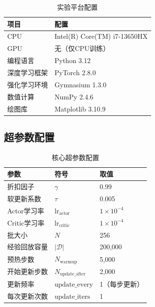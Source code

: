 \documentclass[UTF8,a4paper,12pt]{ctexart}
\begin{document}
\begin{table}[H]
\centering
\caption{实验平台配置}
\label{tab:env_setup}
\begin{tabular}{ll}
\toprule
\textbf{项目} & \textbf{配置} \\
\midrule
CPU & Intel(R) Core(TM) i7-13650HX \\
GPU & 无（仅CPU训练） \\
编程语言 & Python 3.12 \\
深度学习框架 & PyTorch 2.8.0 \\
强化学习环境 & Gymnasium 1.3.0 \\
数值计算 & NumPy 2.4.6 \\
绘图库 & Matplotlib 3.10.9 \\
\bottomrule
\end{tabular}
\end{table}

\subsection{超参数配置}

\begin{table}[H]
\centering
\caption{核心超参数配置}
\label{tab:hyperparams}
\begin{tabular}{lll}
\toprule
\textbf{参数} & \textbf{符号} & \textbf{取值} \\
\midrule
折扣因子 & $\gamma$ & 0.99 \\
软更新系数 & $\tau$ & 0.005 \\
Actor学习率 & $\text{lr}_{\text{actor}}$ & $1\times 10^{-4}$ \\
Critic学习率 & $\text{lr}_{\text{critic}}$ & $1\times 10^{-4}$ \\
批大小 & $N$ & 256 \\
经验回放容量 & $|\mathcal{D}|$ & 200,000 \\
预热步数 & $N_{\text{warmup}}$ & 5,000 \\
开始更新步数 & $N_{\text{update\_after}}$ & 2,000 \\
更新频率 & $\text{update\_every}$ & 1（每步更新） \\
每次更新次数 & $\text{update\_iters}$ & 1 \\
\bottomrule
\end{tabular}
\end{table}
\end{document}
